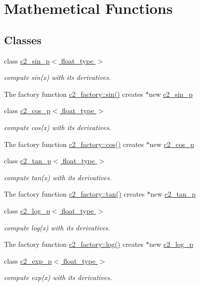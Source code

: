\hypertarget{group__math__functions}{\section{Mathemetical Functions}
\label{group__math__functions}
}
\subsection*{Classes}
\begin{DoxyCompactItemize}
\item 
class \hyperlink{classc2__sin__p}{c2\-\_\-sin\-\_\-p$<$ float\-\_\-type $>$}
\begin{DoxyCompactList}\small\item\em compute sin(x) with its derivatives.

The factory function \hyperlink{classc2__factory_a866854d4fdd6c6678512151dbcd635a5}{c2\-\_\-factory\-::sin()} creates $\ast$new \hyperlink{classc2__sin__p}{c2\-\_\-sin\-\_\-p} \end{DoxyCompactList}\item 
class \hyperlink{classc2__cos__p}{c2\-\_\-cos\-\_\-p$<$ float\-\_\-type $>$}
\begin{DoxyCompactList}\small\item\em compute cos(x) with its derivatives.

The factory function \hyperlink{classc2__factory_abc5ea51417ecef590629a39f7a2227e4}{c2\-\_\-factory\-::cos()} creates $\ast$new \hyperlink{classc2__cos__p}{c2\-\_\-cos\-\_\-p} \end{DoxyCompactList}\item 
class \hyperlink{classc2__tan__p}{c2\-\_\-tan\-\_\-p$<$ float\-\_\-type $>$}
\begin{DoxyCompactList}\small\item\em compute tan(x) with its derivatives.

The factory function \hyperlink{classc2__factory_a2f83cbd3be646166f7e3bef1e27244b9}{c2\-\_\-factory\-::tan()} creates $\ast$new \hyperlink{classc2__tan__p}{c2\-\_\-tan\-\_\-p} \end{DoxyCompactList}\item 
class \hyperlink{classc2__log__p}{c2\-\_\-log\-\_\-p$<$ float\-\_\-type $>$}
\begin{DoxyCompactList}\small\item\em compute log(x) with its derivatives.

The factory function \hyperlink{classc2__factory_af20c7c4fee421c8ee0b51bac1c42302e}{c2\-\_\-factory\-::log()} creates $\ast$new \hyperlink{classc2__log__p}{c2\-\_\-log\-\_\-p} \end{DoxyCompactList}\item 
class \hyperlink{classc2__exp__p}{c2\-\_\-exp\-\_\-p$<$ float\-\_\-type $>$}
\begin{DoxyCompactList}\small\item\em compute exp(x) with its derivatives.


\end{DoxyCompactList}
\end{DoxyCompactItemize}
